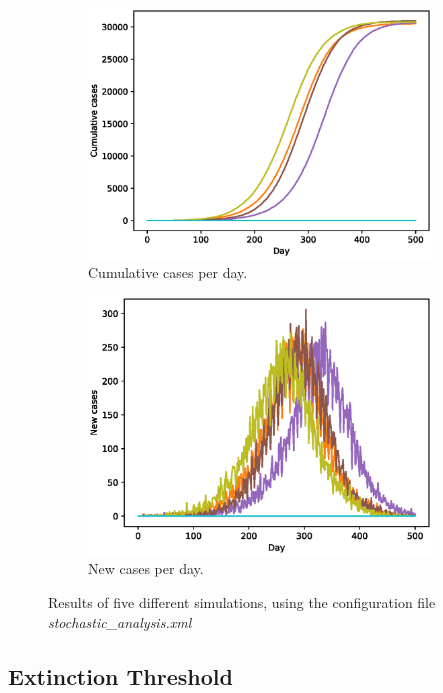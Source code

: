 \documentclass[runningheads]{llncs}
\begin{document}
\begin{figure}[h!]
	\centering
	\begin{subfigure}[b]{0.7\linewidth}
		\includegraphics[width=\linewidth]{cases_cum.eps}
		\caption{Cumulative cases per day.}
	\end{subfigure}
	\begin{subfigure}[b]{0.7\linewidth}
		\includegraphics[width=\linewidth]{cases_per_day.eps}
		\caption{New cases per day.}
	\end{subfigure}
	\caption{Results of five different simulations, using the configuration file \emph{stochastic\_analysis.xml}}
	\label{casesPlots}
\end{figure}


\subsection{Extinction Threshold}
\end{document}
